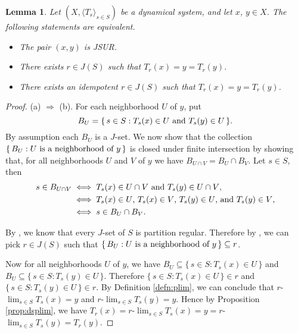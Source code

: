 \documentclass[12pt]{article}
\theoremstyle{plain}
\newtheorem{lem}[thm]{Lemma}
\theoremstyle{definition}
\newcommand{\la}{\langle}
\newcommand{\ra}{\rangle}
\newcommand{\ds}{(X, \la T_s \ra_{s\in S})}
\begin{document}
  \begin{lem}
    \label{lem:JSUR}
    Let $\ds$ be a dynamical system, and let $x$, $y \in X$.
    The following statements are equivalent.
    \begin{itemize}
      \item[(a)] The pair $(x, y)$ is JSUR.
      \item[(b)] There exists $r \in J(S)$ such that $T_r(x) = y = T_r(y)$.
      \item[(c)] There exists an idempotent $r \in J(S)$ such that $T_r(x)
        = y = T_r(y)$. 
    \end{itemize}
  \end{lem}
  \begin{proof}
    (a) $\Rightarrow$ (b). 
    For each neighborhood $U$ of $y$, put 
      \[  
        B_U = \{\, s \in S : \hbox{$T_s(x) \in U$ and $T_s(y) \in U$}
        \,\}.
      \]
    By assumption each $B_U$ is a $J$-set. 
    We now show that the collection $\{\, B_U : \hbox{$U$ is a
      neighborhood of $y$} \,\}$ is closed under finite intersection
    by showing that, for all neighborhoods $U$ and $V$ of $y$ we have $B_{U
      \cap V} = B_U \cap B_V$.
    Let $s \in S$, then 
      \begin{align*}
        s \in B_{U \cap V} &\iff \hbox{$T_s(x) \in U \cap V$ and $T_s(y) \in U
        \cap V$}, \\
      &\iff \hbox{$T_s(x) \in U$, $T_s(x) \in V$, $T_s(y) \in U$, and
        $T_s(y) \in V$}, \\
      &\iff s \in B_U \cap B_V.
      \end{align*}
    
    By \cite[Theorem 2.14]{Hindman:2010fk}, we know that every $J$-set
    of $S$ is partition regular. 
    Therefore by \cite[Theorem 3.11 (b)]{Hindman:1998fk},  we can pick 
    $r \in J(S)$ such that $\{\, B_U : \hbox{$U$ is a neighborhood of
      $y$}\,\} \subseteq r$. 
    
    Now for all neighborhoods $U$ of $y$, we have $B_U \subseteq \{\,
    s \in S : T_s(x) \in U \,\}$ and $B_U \subseteq \{\, s \in S :
    T_s(y) \in U \,\}$. 
    Therefore $\{\, s \in S : T_s(x) \in U\,\} \in r$ and $\{\, s \in
    S : T_s(y) \in U \,\} \in r$. 
    By Definition \ref{defn:plim}, we can conclude that
    $r$-$\displaystyle\lim_{s\in S} T_s(x) = y$ and
    $r$-$\displaystyle\lim_{s \in S} T_s(y) = y$. 
    Hence by Proposition \ref{prop:dsplim}, we have $T_r(x) =
    r$-$\displaystyle\lim_{s \in S} T_s(x) = y = r$-$\displaystyle\lim_{s \in S}
    T_s(y) = T_r(y)$.
  

\end{proof}
\end{document}
